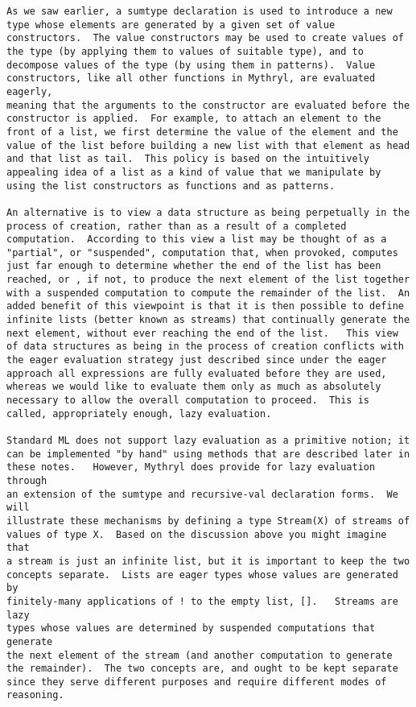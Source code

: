 \begin{verbatim}
As we saw earlier, a sumtype declaration is used to introduce a new 
type whose elements are generated by a given set of value 
constructors.  The value constructors may be used to create values of 
the type (by applying them to values of suitable type), and to 
decompose values of the type (by using them in patterns).  Value 
constructors, like all other functions in Mythryl, are evaluated eagerly, 
meaning that the arguments to the constructor are evaluated before the 
constructor is applied.  For example, to attach an element to the 
front of a list, we first determine the value of the element and the 
value of the list before building a new list with that element as head 
and that list as tail.  This policy is based on the intuitively 
appealing idea of a list as a kind of value that we manipulate by 
using the list constructors as functions and as patterns. 
 
An alternative is to view a data structure as being perpetually in the 
process of creation, rather than as a result of a completed 
computation.  According to this view a list may be thought of as a 
"partial", or "suspended", computation that, when provoked, computes 
just far enough to determine whether the end of the list has been 
reached, or , if not, to produce the next element of the list together 
with a suspended computation to compute the remainder of the list.  An 
added benefit of this viewpoint is that it is then possible to define 
infinite lists (better known as streams) that continually generate the 
next element, without ever reaching the end of the list.   This view 
of data structures as being in the process of creation conflicts with 
the eager evaluation strategy just described since under the eager 
approach all expressions are fully evaluated before they are used, 
whereas we would like to evaluate them only as much as absolutely 
necessary to allow the overall computation to proceed.  This is 
called, appropriately enough, lazy evaluation. 
 
Standard ML does not support lazy evaluation as a primitive notion; it 
can be implemented "by hand" using methods that are described later in 
these notes.   However, Mythryl does provide for lazy evaluation through 
an extension of the sumtype and recursive-val declaration forms.  We will 
illustrate these mechanisms by defining a type Stream(X) of streams of 
values of type X.  Based on the discussion above you might imagine that 
a stream is just an infinite list, but it is important to keep the two 
concepts separate.  Lists are eager types whose values are generated by 
finitely-many applications of ! to the empty list, [].   Streams are lazy 
types whose values are determined by suspended computations that generate 
the next element of the stream (and another computation to generate 
the remainder).  The two concepts are, and ought to be kept separate 
since they serve different purposes and require different modes of 
reasoning. 
 

\end{verbatim}
